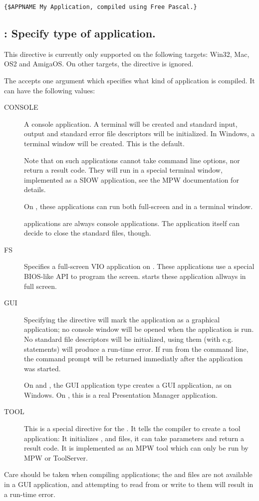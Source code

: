 \begin{verbatim}
{$APPNAME My Application, compiled using Free Pascal.}
\end{verbatim}

\subsection{ : Specify type of application.}
This directive is currently only supported on the following targets:
 Win32, Mac, OS2 and AmigaOS. On other targets, the directive is ignored.

The  accepts one argument which specifies what kind
of application is compiled. It can have the following
values:
\begin{description}
\item[CONSOLE] A console application. A terminal will be created and
standard input, output and standard error file descriptors will be
initialized. In Windows, a terminal window will be created. This is the
default. 

Note that on \macos such applications cannot take command line
options, nor return a result code. They will run in a special 
terminal window, implemented as a SIOW application, see the MPW 
documentation for details.

On \ostwo, these applications can run both full-screen and in a terminal
window.

\linux applications are always console applications. The application itself
can decide to close the standard files, though.

\item[FS] Specifies a full-screen VIO application on \ostwo. These
applications use a special BIOS-like API to program the screen. \ostwo
starts these application allways in full screen.

\item[GUI] Specifying the  directive will mark the 
application as a graphical application; no console window will be opened 
when the application is run. No standard file descriptors will be
initialized, using them (with e.g.  statements) will produce  a
run-time error. If run from the command line, the command prompt will be
returned immediatly after the application was started.

On \ostwo and \macos, the GUI application type creates a GUI application, as
on Windows. On \ostwo, this is a real Presentation Manager application.

\item[TOOL] This is a special directive for the \macos. It tells the compiler
to create a tool application: It initializes ,  and
 files, it can take parameters and return a result code. It is implemented as an MPW
tool which can only be run by MPW or ToolServer.
\end{description} 
Care should be taken when compiling  applications; the 
and  files are not available in a GUI application, and
attempting to read from or write to them will result in a run-time error.

